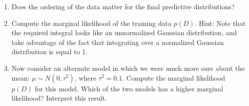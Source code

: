 \documentclass[submit]{harvardml}
\begin{document}
\begin{problem}
\begin{enumerate}
  \item Does the ordering of the data matter for the final predictive
  distributions?  

  \item Compute the marginal likelihood of the training data $p(D)$.
  Hint: Note that the required integral looks like an unnormalized
  Gaussian distribution, and take advantage of the fact that
  integrating over a normalized Gaussian distribution is equal to 1.

  \item Now consider an alternate model in which we were much more sure
  about the mean: $\mu \sim N(0,\tau^2)$, where $\tau^2 = 0.1$.
  Compute the marginal likelihood $p(D)$ for this model.  Which of the
  two models has a higher marginal likelihood? Interpret this result.
\end{enumerate}

\end{problem}
\newpage
\end{document}
